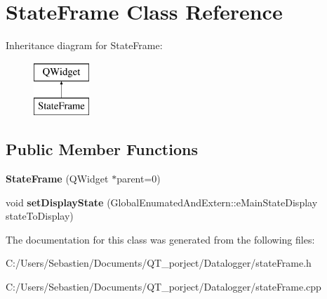 \hypertarget{class_state_frame}{}\section{State\+Frame Class Reference}
\label{class_state_frame}
Inheritance diagram for State\+Frame\+:\begin{figure}[H]
\begin{center}
\leavevmode
\includegraphics[height=2.000000cm]{class_state_frame}
\end{center}
\end{figure}
\subsection*{Public Member Functions}
\begin{DoxyCompactItemize}
\item 
\mbox{\label{class_state_frame_a5af202e8a64904191de6d2798e406041}} 
{\bfseries State\+Frame} (Q\+Widget $\ast$parent=0)
\item 
\mbox{\label{class_state_frame_a84cbb8d6f0e1c70adebdc3d4e22a3a08}} 
void {\bfseries set\+Display\+State} (Global\+Enumated\+And\+Extern\+::e\+Main\+State\+Display state\+To\+Display)
\end{DoxyCompactItemize}


The documentation for this class was generated from the following files\+:\begin{DoxyCompactItemize}
\item 
C\+:/\+Users/\+Sebastien/\+Documents/\+Q\+T\+\_\+porject/\+Datalogger/state\+Frame.\+h\item 
C\+:/\+Users/\+Sebastien/\+Documents/\+Q\+T\+\_\+porject/\+Datalogger/state\+Frame.\+cpp\end{DoxyCompactItemize}
